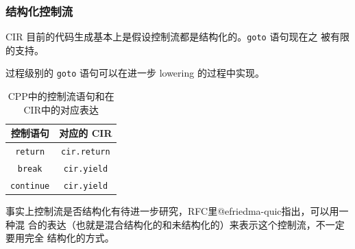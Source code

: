 \begin{frame}
    \frametitle{结构化控制流}

    CIR 目前的代码生成基本上是假设控制流都是结构化的。\texttt{goto} 语句现在之
    被有限的支持。

    过程级别的 \texttt{goto} 语句可以在进一步 lowering 的过程中实现。

    \begin{table}
        \centering
        \begin{tabular}{cc}
            \toprule
            控制语句              & 对应的 CIR             \\
            \midrule
            \texttt{return}   & \texttt{cir.return} \\
            \texttt{break}    & \texttt{cir.yield}  \\
            \texttt{continue} & \texttt{cir.yield}  \\
            \bottomrule
        \end{tabular}
        \caption{CPP中的控制流语句和在CIR中的对应表达}
        \label{tab:control-statements}
    \end{table}

    事实上控制流是否结构化有待进一步研究，RFC里@efriedma-quic指出，可以用一种混
    合的表达（也就是混合结构化的和未结构化的）来表示这个控制流，不一定要用完全
    结构化的方式。

\end{frame}
